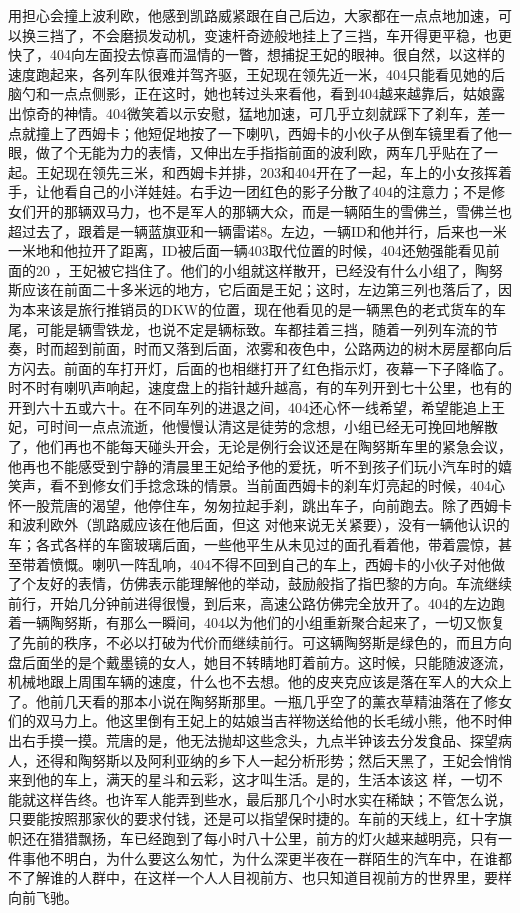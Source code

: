 \documentclass{article}
\begin{document}
\newpage
用担心会撞上波利欧，他感到凯路威紧跟在自己后边，大家都在一点点地加速，可以换三挡了，不会磨损发动机，变速杆奇迹般地挂上了三挡，车开得更平稳，也更快了，404向左面投去惊喜而温情的一瞥，想捕捉王妃的眼神。很自然，以这样的速度跑起来，各列车队很难并驾齐驱，王妃现在领先近一米，404只能看见她的后脑勺和一点点侧影，正在这时，她也转过头来看他，看到404越来越靠后，姑娘露出惊奇的神情。404微笑着以示安慰，猛地加速，可几乎立刻就踩下了刹车，差一点就撞上了西姆卡；他短促地按了一下喇叭，西姆卡的小伙子从倒车镜里看了他一眼，做了个无能为力的表情，又伸出左手指指前面的波利欧，两车几乎贴在了一起。王妃现在领先三米，和西姆卡并排，203和404开在了一起，车上的小女孩挥着手，让他看自己的小洋娃娃。右手边一团红色的影子分散了404的注意力；不是修女们开的那辆双马力，也不是军人的那辆大众，而是一辆陌生的雪佛兰，雪佛兰也超过去了，跟着是一辆蓝旗亚和一辆雷诺8。左边，一辆ID和他并行，后来也一米一米地和他拉开了距离，ID被后面一辆403取代位置的时候，404还勉强能看见前面的20
，王妃被它挡住了。他们的小组就这样散开，已经没有什么小组了，陶努斯应该在前面二十多米远的地方，它后面是王妃；这时，左边第三列也落后了，因为本来该是旅行推销员的DKW的位置，现在他看见的是一辆黑色的老式货车的车尾，可能是辆雪铁龙，也说不定是辆标致。车都挂着三挡，随着一列列车流的节奏，时而超到前面，时而又落到后面，浓雾和夜色中，公路两边的树木房屋都向后方闪去。前面的车打开灯，后面的也相继打开了红色指示灯，夜幕一下子降临了。时不时有喇叭声响起，速度盘上的指针越升越高，有的车列开到七十公里，也有的开到六十五或六十。在不同车列的进退之间，404还心怀一线希望，希望能追上王妃，可时间一点点流逝，他慢慢认清这是徒劳的念想，小组已经无可挽回地解散了，他们再也不能每天碰头开会，无论是例行会议还是在陶努斯车里的紧急会议，他再也不能感受到宁静的清晨里王妃给予他的爱抚，听不到孩子们玩小汽车时的嬉笑声，看不到修女们手捻念珠的情景。当前面西姆卡的刹车灯亮起的时候，404心怀一股荒唐的渴望，他停住车，匆匆拉起手刹，跳出车子，向前跑去。除了西姆卡和波利欧外（凯路威应该在他后面，但这
\newpage
对他来说无关紧要），没有一辆他认识的车；各式各样的车窗玻璃后面，一些他平生从未见过的面孔看着他，带着震惊，甚至带着愤慨。喇叭一阵乱响，404不得不回到自己的车上，西姆卡的小伙子对他做了个友好的表情，仿佛表示能理解他的举动，鼓励般指了指巴黎的方向。车流继续前行，开始几分钟前进得很慢，到后来，高速公路仿佛完全放开了。404的左边跑着一辆陶努斯，有那么一瞬间，404以为他们的小组重新聚合起来了，一切又恢复了先前的秩序，不必以打破为代价而继续前行。可这辆陶努斯是绿色的，而且方向盘后面坐的是个戴墨镜的女人，她目不转睛地盯着前方。这时候，只能随波逐流，机械地跟上周围车辆的速度，什么也不去想。他的皮夹克应该是落在军人的大众上了。他前几天看的那本小说在陶努斯那里。一瓶几乎空了的薰衣草精油落在了修女们的双马力上。他这里倒有王妃上的姑娘当吉祥物送给他的长毛绒小熊，他不时伸出右手摸一摸。荒唐的是，他无法抛却这些念头，九点半钟该去分发食品、探望病人，还得和陶努斯以及阿利亚纳的乡下人一起分析形势；然后天黑了，王妃会悄悄来到他的车上，满天的星斗和云彩，这才叫生活。是的，生活本该这
\newpage
样，一切不能就这样告终。也许军人能弄到些水，最后那几个小时水实在稀缺；不管怎么说，只要能按照那家伙的要求付钱，还是可以指望保时捷的。车前的天线上，红十字旗帜还在猎猎飘扬，车已经跑到了每小时八十公里，前方的灯火越来越明亮，只有一件事他不明白，为什么要这么匆忙，为什么深更半夜在一群陌生的汽车中，在谁都不了解谁的人群中，在这样一个人人目视前方、也只知道目视前方的世界里，要样向前飞驰。
\end{document}
